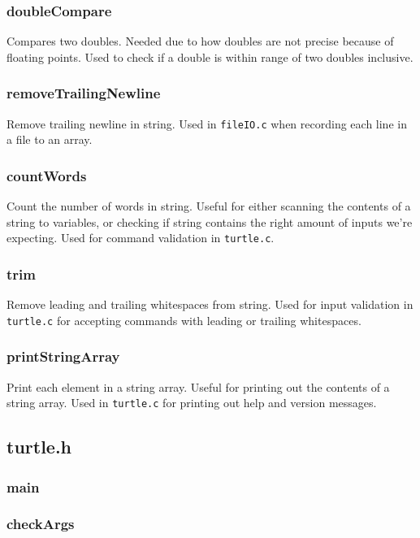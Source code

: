 \documentclass[a4paper, 12pt, titlepage]{article}
\newcommand{\code}[1]{\small\texttt{#1}\normalsize}
\begin{document}
\subsubsection{doubleCompare}

Compares two doubles. Needed due to how doubles are not precise because of 
floating points. Used to check if a double is within range of two doubles 
inclusive.

\subsubsection{removeTrailingNewline}

Remove trailing newline in string. Used in \code{fileIO.c} when recording 
each line in a file to an array.

\subsubsection{countWords}

Count the number of words in string. Useful for either scanning the contents 
of a string to variables, or checking if string contains the right amount of 
inputs we're expecting. Used for command validation in \code{turtle.c}.

\subsubsection{trim}

Remove leading and trailing whitespaces from string. Used for input 
validation in \code{turtle.c} for accepting commands with leading or trailing 
whitespaces.

\subsubsection{printStringArray}

Print each element in a string array. Useful for printing out the contents 
of a string array. Used in \code{turtle.c} for printing out help and version 
messages.

\subsection{turtle.h}
\subsubsection{main}

\subsubsection{checkArgs}
\end{document}
